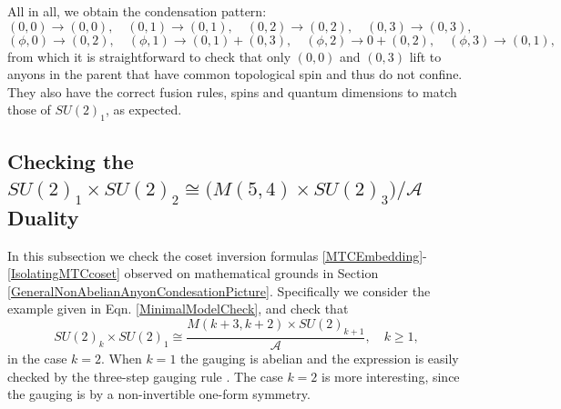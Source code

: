 \documentclass[11pt]{article}
\numberwithin{equation}{section}
\begin{document}
All in all, we obtain the condensation pattern:
\begin{equation}
    (0,0) \to (0,0), \quad (0,1) \to (0,1), \quad (0,2) \to (0,2), \quad (0,3) \to (0,3), \nonumber
\end{equation}
\begin{equation}
    (\phi,0) \to (0,2), \quad (\phi,1) \to (0,1) + (0,3), \quad (\phi,2) \to 0 + (0,2), \quad (\phi,3) \to (0,1), \nonumber
\end{equation}
from which it is straightforward to check that only $(0,0)$ and $(0,3)$ lift to anyons in the parent that have common topological spin and thus do not confine. They also have the correct fusion rules, spins and quantum dimensions to match those of $SU(2)_{1}$, as expected. 

\subsection{Checking the $SU(2)_{1} \times SU(2)_{2} \cong \big( M(5,4) \times SU(2)_{3} \big) / \mathcal{A}$ Duality} \label{cosetinversionformulachecksection}



In this subsection we check the coset inversion formulas \eqref{MTCEmbedding}-\eqref{IsolatingMTCcoset} observed on mathematical grounds in Section \ref{GeneralNonAbelianAnyonCondesationPicture}. Specifically we consider the example given in Eqn. \eqref{MinimalModelCheck}, and check that
\begin{equation}
    SU(2)_{k} \times SU(2)_{1} \cong \frac{M(k+3,k+2) \times SU(2)_{k+1}}{\mathcal{A}}, \quad k \geq 1,
\end{equation}
in the case $k=2$. When $k=1$ the gauging is abelian and the expression is easily checked by the three-step gauging rule \cite{Moore:1989yh, Hsin:2018vcg}. The case $k=2$ is more interesting, since the gauging is by a non-invertible one-form symmetry.
\end{document}
